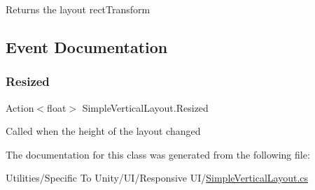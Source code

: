 Returns the layout rect\+Transform 



\subsection{Event Documentation}
\mbox{\label{class_simple_vertical_layout_a3e176b9b3570154346427aa218f8eae8}} 
\subsubsection{\texorpdfstring{Resized}{Resized}}
{\footnotesize\ttfamily Action$<$float$>$ Simple\+Vertical\+Layout.\+Resized}



Called when the height of the layout changed 



The documentation for this class was generated from the following file\+:\begin{DoxyCompactItemize}
\item 
Utilities/\+Specific To Unity/\+U\+I/\+Responsive U\+I/\hyperlink{_simple_vertical_layout_8cs}{Simple\+Vertical\+Layout.\+cs}\end{DoxyCompactItemize}
